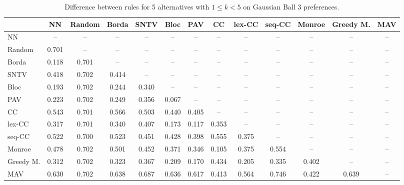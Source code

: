 
\begin{table*}[htbp]
\centering
\begin{tabular}{lcccccccccccc}
\toprule
 & NN & Random & Borda & SNTV & Bloc & PAV & CC & lex-CC & seq-CC & Monroe & Greedy M. & MAV \\
\midrule
NN & -- & -- & -- & -- & -- & -- & -- & -- & -- & -- & -- & -- \\
Random & \cellcolor{blue!70} 0.701 & -- & -- & -- & -- & -- & -- & -- & -- & -- & -- & -- \\
Borda & \cellcolor{blue!11} 0.118 & \cellcolor{blue!70} 0.701 & -- & -- & -- & -- & -- & -- & -- & -- & -- & -- \\
SNTV & \cellcolor{blue!41} 0.418 & \cellcolor{blue!70} 0.702 & \cellcolor{blue!41} 0.414 & -- & -- & -- & -- & -- & -- & -- & -- & -- \\
Bloc & \cellcolor{blue!19} 0.193 & \cellcolor{blue!70} 0.702 & \cellcolor{blue!24} 0.244 & \cellcolor{blue!34} 0.340 & -- & -- & -- & -- & -- & -- & -- & -- \\
PAV & \cellcolor{blue!22} 0.223 & \cellcolor{blue!70} 0.702 & \cellcolor{blue!24} 0.249 & \cellcolor{blue!35} 0.356 & \cellcolor{blue!6} 0.067 & -- & -- & -- & -- & -- & -- & -- \\
CC & \cellcolor{blue!54} 0.543 & \cellcolor{blue!70} 0.701 & \cellcolor{blue!56} 0.566 & \cellcolor{blue!50} 0.503 & \cellcolor{blue!44} 0.440 & \cellcolor{blue!40} 0.405 & -- & -- & -- & -- & -- & -- \\
lex-CC & \cellcolor{blue!31} 0.317 & \cellcolor{blue!70} 0.701 & \cellcolor{blue!34} 0.340 & \cellcolor{blue!40} 0.407 & \cellcolor{blue!17} 0.173 & \cellcolor{blue!11} 0.117 & \cellcolor{blue!35} 0.353 & -- & -- & -- & -- & -- \\
seq-CC & \cellcolor{blue!52} 0.522 & \cellcolor{blue!70} 0.700 & \cellcolor{blue!52} 0.523 & \cellcolor{blue!45} 0.451 & \cellcolor{blue!42} 0.428 & \cellcolor{blue!39} 0.398 & \cellcolor{blue!55} 0.555 & \cellcolor{blue!37} 0.375 & -- & -- & -- & -- \\
Monroe & \cellcolor{blue!47} 0.478 & \cellcolor{blue!70} 0.702 & \cellcolor{blue!50} 0.501 & \cellcolor{blue!45} 0.452 & \cellcolor{blue!37} 0.371 & \cellcolor{blue!34} 0.346 & \cellcolor{blue!10} 0.105 & \cellcolor{blue!37} 0.375 & \cellcolor{blue!55} 0.554 & -- & -- & -- \\
Greedy M. & \cellcolor{blue!31} 0.312 & \cellcolor{blue!70} 0.702 & \cellcolor{blue!32} 0.323 & \cellcolor{blue!36} 0.367 & \cellcolor{blue!20} 0.209 & \cellcolor{blue!17} 0.170 & \cellcolor{blue!43} 0.434 & \cellcolor{blue!20} 0.205 & \cellcolor{blue!33} 0.335 & \cellcolor{blue!40} 0.402 & -- & -- \\
MAV & \cellcolor{blue!63} 0.630 & \cellcolor{blue!70} 0.702 & \cellcolor{blue!63} 0.638 & \cellcolor{blue!68} 0.687 & \cellcolor{blue!63} 0.636 & \cellcolor{blue!61} 0.617 & \cellcolor{blue!41} 0.413 & \cellcolor{blue!56} 0.564 & \cellcolor{blue!74} 0.746 & \cellcolor{blue!42} 0.422 & \cellcolor{blue!63} 0.639 & -- \\
\bottomrule
\end{tabular}

\caption{Difference between rules for 5 alternatives with $1 \leq k < 5$ on Gaussian Ball 3 preferences.}
\label{tab:rule_distance_heatmap-m=[5]-pref_dist=euclidean__args__dimensions=3_-_space=gaussian_ball}
\end{table*}
    